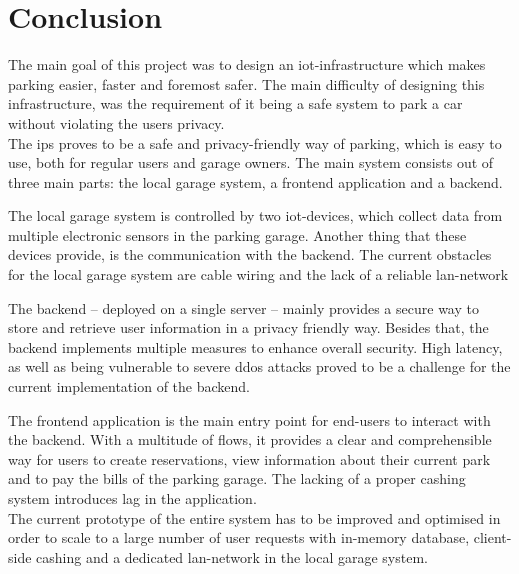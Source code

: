 \section{Conclusion}\label{sec:conclusion}
The main goal of this project was to design an \ac{iot}-infrastructure which makes parking easier, faster and foremost safer. The main difficulty of designing this infrastructure, was the requirement of it being a safe system to park a car without violating the users privacy. \\

The \ac{ips} proves to be a safe and privacy-friendly way of parking, which is easy to use, both for regular users and garage owners. The main system consists out of three main parts: the local garage system, a frontend application and a backend.

\ind The local garage system is controlled by two \ac{iot}-devices, which collect data from multiple electronic sensors in the parking garage. Another thing that these devices provide, is the communication with the backend. The current obstacles for the local garage system are cable wiring and the lack of a reliable \ac{lan}-network

\ind The backend -- deployed on a single server -- mainly provides a secure way to store and retrieve user information in a privacy friendly way. Besides that, the backend implements multiple measures to enhance overall security. High latency, as well as being vulnerable to severe \ac{ddos} attacks proved to be a challenge for the current implementation of the backend.

\ind The frontend application is the main entry point for end-users to interact with the backend. With a multitude of flows, it provides a clear and comprehensible way for users to create reservations, view information about their current park and to pay the bills of the parking garage. The lacking of a proper cashing system introduces lag in the application. \\

The current prototype of the entire system has to be improved and optimised in order to scale to a large number of user requests with in-memory database, client-side cashing and a dedicated \ac{lan}-network in the local garage system.




